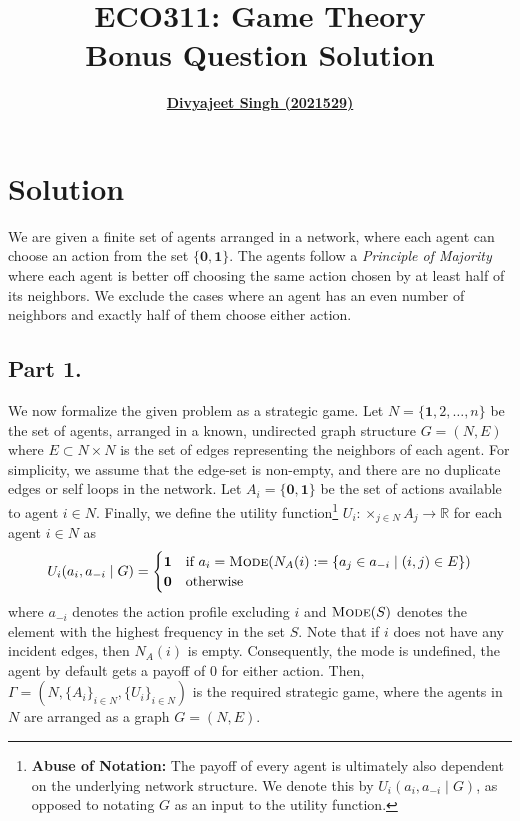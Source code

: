 \documentclass[9pt]{article}
\title{
    \textbf{ECO311: Game Theory} \\
    \textbf{\large{Bonus Question Solution}}
}
\author{
    \href{mailto:divyajeet21529@iiitd.ac.in}{\textbf{Divyajeet Singh (2021529)}}
}
\date{}
\begin{document}
\maketitle

\section*{Solution}
We are given a finite set of agents arranged in a network, where each agent can choose an action from the set $\{\textbf{0}, \textbf{1}\}$.
The agents follow a \textit{Principle of Majority} where each agent is better off choosing the same action chosen by at least half of its neighbors.
We exclude the cases where an agent has an even number of neighbors and exactly half of them choose either action.

\subsection*{Part 1.}
We now formalize the given problem as a strategic game.
Let $N = \{\textbf{1}, 2, \ldots, n\}$ be the set of agents, arranged in a known, undirected graph structure $G = (N, E)$ where $E \subset N \times N$ is the set of edges representing the neighbors of each agent.
For simplicity, we assume that the edge-set is non-empty, and there are no duplicate edges or self loops in the network.
Let $A_{i} = \{\textbf{0}, \textbf{1}\}$ be the set of actions available to agent $i \in N$.
Finally, we define the utility function\footnote{\textbf{Abuse of Notation:} The payoff of every agent is ultimately also dependent on the underlying network structure.
We denote this by $U_{i}(a_{i}, a_{-i} \mid G)$, as opposed to notating $G$ as an input to the utility function.}
$U_{i}: \times_{j \in N} A_{j} \rightarrow \mathbb{R}$ for each agent $i \in N$ as
\begin{equation}
    \label{utility}
    U_{i}(a_{i}, a_{-i} \mid G) = \begin{cases}
        \textbf{1} & \text{if } a_{i} = \Call{Mode}{N_{A}(i) := \{ a_{j} \in a_{-i} \mid (i, j) \in E \}} \\
        \textbf{0} & \text{otherwise}
    \end{cases}
\end{equation}
where $a_{-i}$ denotes the action profile excluding $i$ and $\Call{Mode}{S}$ denotes the element with the highest frequency in the set $S$.
Note that if $i$ does not have any incident edges, then $N_{A}(i)$ is empty.
Consequently, the mode is undefined, the agent by default gets a payoff of 0 for either action.
Then, $\Gamma = (N, \{A_{i}\}_{i \in N}, \{U_{i}\}_{i \in N})$ is the required strategic game, where the agents in $N$ are arranged as a graph $G = (N, E)$.
\end{document}
